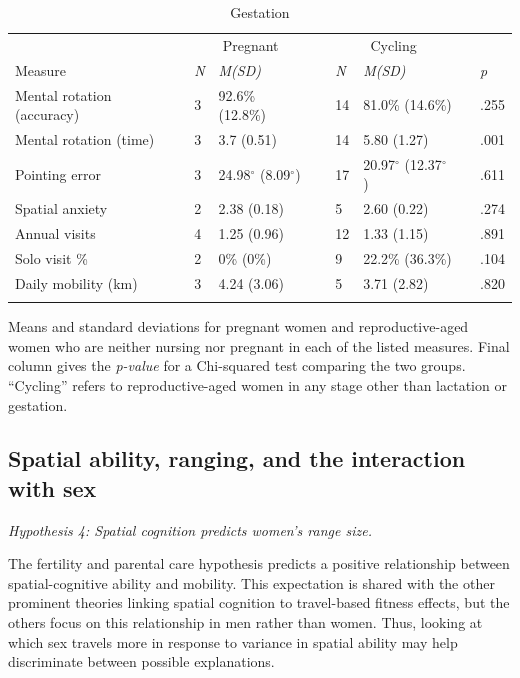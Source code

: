 \begin{table}[h!]
\caption{Gestation}
\label{tab:preg}  
\begin{tabular}{llllllll}
\hline\noalign{\smallskip}
& \multicolumn{2}{c}{Pregnant} && \multicolumn{2}{c}{Cycling} && \\
Measure & \emph{N} & \emph{M(SD)} && \emph{N} & \emph{M(SD)} && \emph{p} \\
\noalign{\smallskip}\hline\noalign{\smallskip}
Mental rotation (accuracy) & 3 & 92.6\% (12.8\%) && 14 & 81.0\% (14.6\%) && .255 \\
Mental rotation (time) & 3 & 3.7 (0.51) && 14 & 5.80 (1.27) && .001 \\
Pointing error & 3 & 24.98$^{\circ}$ (8.09$^{\circ}$) && 17 & 20.97$^{\circ}$ (12.37$^{\circ}$) && .611 \\
Spatial anxiety & 2 & 2.38 (0.18) && 5 & 2.60 (0.22) && .274 \\
Annual visits & 4 & 1.25 (0.96) && 12 & 1.33 (1.15) && .891 \\
Solo visit \% & 2 & 0\% (0\%) && 9 & 22.2\% (36.3\%) && .104 \\
Daily mobility (km) & 3 & 4.24 (3.06) && 5 & 3.71 (2.82) && .820 \\
\noalign{\smallskip}\hline
\end{tabular}\par
\bigskip
Means and standard deviations for pregnant women and reproductive-aged women who are neither nursing nor pregnant in each of the listed measures. Final column gives the \emph{p-value} for a Chi-squared test comparing the two groups.  ``Cycling'' refers to reproductive-aged women in any stage other than lactation or gestation. 
\end{table}	

	\subsection{Spatial ability, ranging, and the interaction with sex}
	\label{sec:3.4}
	
\emph{Hypothesis 4:  Spatial cognition predicts women's range size.}
	\smallskip

The fertility and parental care hypothesis predicts a positive relationship between spatial-cognitive ability and mobility. This expectation is shared with the other prominent theories linking spatial cognition to travel-based fitness effects, but the others focus on this relationship in men rather than women.  Thus, looking at which sex travels more in response to variance in spatial ability may help discriminate between possible explanations.	

